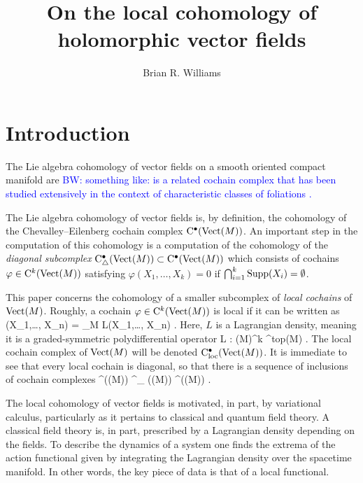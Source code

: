 \documentclass[11pt]{amsart}
\numberwithin{equation}{section}
\def\brian{\textcolor{blue}{BW: }\textcolor{blue}}
\begin{document}
\title{On the local cohomology of holomorphic vector fields}

\author{Brian R. Williams}
\address{School of Mathematics\\
University of Edinburgh \\ 
Edinburgh \\ 
UK}

\maketitle

\tableofcontents

\section{Introduction}

The Lie algebra cohomology of vector fields on a smooth oriented compact manifold are \brian{something like: is a related cochain complex that has been studied extensively in the context of characteristic classes of foliations \cite{Fuks, Guillemin, LosikDiag, Bernstein}.}

The Lie algebra cohomology of vector fields is, by definition, the cohomology of the Chevalley--Eilenberg cochain complex ${\rm C}^\bullet(\operatorname{Vect}(M))$.
An important step in the computation of this cohomology is a computation of the cohomology of the {\em diagonal subcomplex} ${\rm C}^\bullet_{\triangle} (\operatorname{Vect}(M)) \subset {\rm C}^\bullet(\operatorname{Vect}(M))$ which consists of cochains $\varphi \in {\rm C}^k(\operatorname{Vect}(M))$ satisfying $\varphi(X_1,\ldots,X_k) = 0$ if $\bigcap_{i=1}^k {\rm Supp}(X_i) = \emptyset$. 

This paper concerns the cohomology of a smaller subcomplex of {\em local cochains} of ${\rm Vect}(M)$. 
Roughly, a cochain $\varphi \in {\rm C}^k(\operatorname{Vect}(M))$ is local if it can be written as
\beqn
\varphi (X_1,\dots, X_n) = \int_M L(X_1,\ldots, X_n) .
\eeqn
Here, $L$ is a Lagrangian density, meaning it is a graded-symmetric polydifferential operator
\beqn
L : \Vect(M)^{\otimes k} \to \Omega^{\rm top}(M) .
\eeqn
The local cochain complex of $\operatorname{Vect}(M)$ will be denoted ${\rm C}_{\rm loc}^\bullet(\operatorname{Vect}(M))$. 
It is immediate to see that every local cochain is diagonal, so that there is a sequence of inclusions of cochain complexes
\beqn
\cloc^\bu(\Vect(M)) ^\bu_{\triangle} (\Vect(M)) \hookrightarrow \clie^\bu(\Vect(M)) .
\eeqn

The local cohomology of vector fields is motivated, in part, by variational calculus, particularly as it pertains to classical and quantum field theory. 
A classical field theory is, in part, prescribed by a Lagrangian density depending on the fields. 
To describe the dynamics of a system one finds the extrema of the action functional given by integrating the Lagrangian density over the spacetime manifold.
In other words, the key piece of data is that of a local functional.
\end{document}
